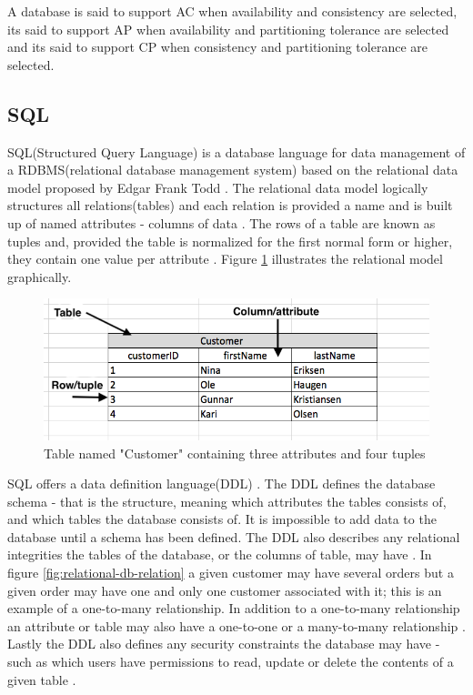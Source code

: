 A database is said to support AC when availability and consistency are selected, its said to support AP when availability and partitioning tolerance are selected and its said to support CP when consistency and partitioning tolerance are selected.
\fi

\subsection{SQL} 
SQL(Structured Query Language) is a database language for data management\cite{sql-goal} of a RDBMS(relational database management system) \cite{sql-is-a-rdbms} based on the relational data model proposed by Edgar Frank Todd \cite{rdbms}.
The relational data model logically structures all relations(tables) and each relation is provided a name and is built up of named attributes - columns of data \cite{sql-is-a-rdbms}.
The rows of a table are known as tuples \cite{sql-is-a-rdbms} and, provided the table is normalized for the first normal form or higher, they contain one value per attribute \cite{sql-1nf}.
Figure \ref{fig:relational-db-visualised} illustrates the relational model graphically.

\begin{figure}
    \centering
    \includegraphics[width=115mm,scale=1]{figures/relational-db-visualised.png}
    \caption{Table named "Customer" containing three attributes and four tuples}
    \label{fig:relational-db-visualised}
\end{figure}

SQL offers a data definition language(DDL) \cite{sql-components}.
The DDL defines the database schema - that is the structure, meaning which attributes the tables consists of, and which tables the database consists of.
It is impossible to add data to the database until a schema has been defined.
The DDL also describes any relational integrities the tables of the database, or the columns of table, may have \cite{sql-constraints}.
In figure \ref{fig:relational-db-relation} a given customer may have several orders but a given order may have one and only one customer associated with it; this is an example of a one-to-many relationship.
In addition to a one-to-many relationship an attribute or table may also have a one-to-one or a many-to-many relationship \cite{sql-relationships}.
Lastly the DDL also defines any security constraints the database may have - such as which users have permissions to read, update or delete the contents of a given table \cite{sql-ddl}.

